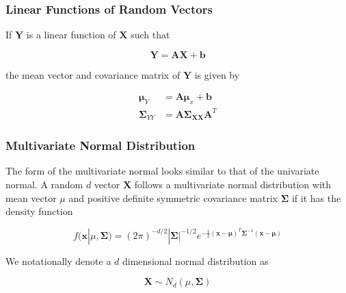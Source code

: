 \documentclass{beamer}
\begin{document}
\begin{frame}
\frametitle{Linear Functions of Random Vectors}
If $\mathbf{Y}$ is a linear function of $\mathbf{X}$ such that

$$\mathbf{Y} = \mathbf{AX} + \mathbf{b}$$

the mean vector and covariance matrix of $\mathbf{Y}$ is given by

\begin{align*}
\mathbf{\mu}_Y &= \mathbf{A\mu}_x + \mathbf{b}\\
\mathbf{\Sigma}_{YY} &= \mathbf{A\Sigma_{XX}A}^T
\end{align*}
\end{frame}

\begin{frame}
\frametitle{Multivariate Normal Distribution}
The form of the multivariate normal looks similar to that of the univariate normal.  A random $d$ vector $\mathbf{X}$ follows a multivariate normal distribution with mean vector $\mu$ and positive definite symmetric covariance matrix $\mathbf{\Sigma}$ if it has the density function

$$f(\mathbf{x}|\mu, \mathbf{\Sigma}) = (2\pi)^{-d/2}|\mathbf{\Sigma}|^{-1/2} e^{-\frac{1}{2} (\mathbf{x} - \mathbf{\mu})^T \mathbf{\Sigma}^{-1}(\mathbf{x} - \mathbf{\mu})}$$

We notationally denote a $d$ dimensional normal distribution as 

$$\mathbf{X} \sim N_d(\mu, \mathbf{\Sigma})$$
\end{frame}
\end{document}
